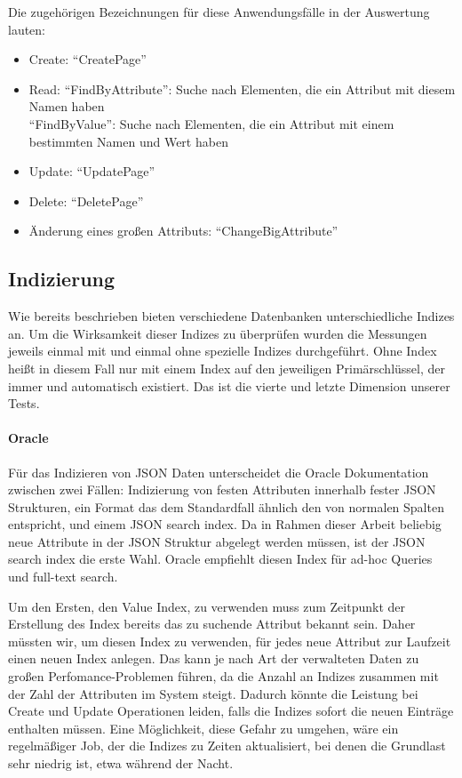Die zugehörigen Bezeichnungen für diese Anwendungsfälle in der Auswertung lauten:

\begin{itemize}
\item Create: ``CreatePage''
\item Read: ``FindByAttribute'': Suche nach Elementen, die ein Attribut mit diesem Namen haben\\
``FindByValue'': Suche nach Elementen, die ein Attribut mit einem bestimmten Namen und Wert haben
\item Update: ``UpdatePage''
\item Delete: ``DeletePage''
\item Änderung eines großen Attributs: ``ChangeBigAttribute''
\end{itemize}


\label{ssec:indexes}
\subsection{Indizierung}

Wie bereits beschrieben bieten verschiedene Datenbanken unterschiedliche Indizes an. Um die Wirksamkeit dieser Indizes zu überprüfen wurden die Messungen jeweils einmal mit und einmal ohne spezielle Indizes durchgeführt. Ohne Index heißt in diesem Fall nur mit einem Index auf den jeweiligen Primärschlüssel, der immer und automatisch existiert.
Das ist die vierte und letzte Dimension unserer Tests.

\paragraph{Oracle}

Für das Indizieren von JSON Daten unterscheidet die Oracle Dokumentation zwischen zwei Fällen: Indizierung von festen Attributen innerhalb fester JSON Strukturen, ein Format das dem Standardfall ähnlich den von normalen Spalten entspricht, und einem JSON search index. Da in Rahmen dieser Arbeit beliebig neue Attribute in der JSON Struktur abgelegt werden müssen, ist der JSON search index die erste Wahl. Oracle empfiehlt diesen Index für ad-hoc Queries und full-text search.

Um den Ersten, den Value Index, zu verwenden muss zum Zeitpunkt der Erstellung des Index bereits das zu suchende Attribut bekannt sein. Daher müssten wir, um diesen Index zu verwenden, für jedes neue Attribut zur Laufzeit einen neuen Index anlegen. Das kann je nach Art der verwalteten Daten zu großen Perfomance-Problemen führen, da die Anzahl an Indizes zusammen mit der Zahl der Attributen im System steigt. Dadurch könnte die Leistung bei Create und Update Operationen leiden, falls die Indizes sofort die neuen Einträge enthalten müssen. Eine Möglichkeit, diese Gefahr zu umgehen, wäre ein regelmäßiger Job, der die Indizes zu Zeiten aktualisiert, bei denen die Grundlast sehr niedrig ist, etwa während der Nacht.

